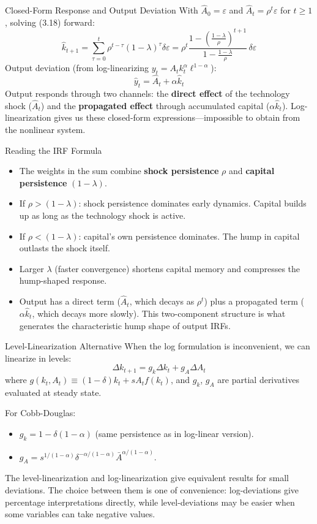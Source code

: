 \documentclass[aspectratio=169,10pt]{beamer}
\newcommand{\apxbutton}[1]{\hfill\hyperlink{#1}{\beamerbutton{Appendix}}}
\begin{document}
\begin{frame}{Closed-Form Response and Output Deviation}
\hypertarget{m-a16}{}
With $\hat{A}_0=\varepsilon$ and $\hat{A}_t=\rho^t\varepsilon$ for $t\geq 1$, solving (3.18) forward:
\[
\hat{k}_{t+1}=\sum_{\tau=0}^{t}\rho^{t-\tau}(1-\lambda)^{\tau}\delta\varepsilon
= \rho^t \frac{1-\left(\frac{1-\lambda}{\rho}\right)^{t+1}}{1-\frac{1-\lambda}{\rho}}\,\delta\varepsilon
\]
Output deviation (from log-linearizing $y_t = A_t k_t^{\alpha}\ell^{1-\alpha}$):
\[
\hat{y}_t=\hat{A}_t+\alpha\hat{k}_t
\]
Output responds through two channels: the \textbf{direct effect} of the technology shock ($\hat{A}_t$) and the \textbf{propagated effect} through accumulated capital ($\alpha\hat{k}_t$). Log-linearization gives us these closed-form expressions---impossible to obtain from the nonlinear system.
\apxbutton{a16}
\end{frame}

\begin{frame}{Reading the IRF Formula}
\begin{itemize}
  \item The weights in the sum combine \textbf{shock persistence} $\rho$ and \textbf{capital persistence} $(1-\lambda)$.
  \item If $\rho>(1-\lambda)$: shock persistence dominates early dynamics. Capital builds up as long as the technology shock is active.
  \item If $\rho<(1-\lambda)$: capital's own persistence dominates. The hump in capital outlasts the shock itself.
  \item Larger $\lambda$ (faster convergence) shortens capital memory and compresses the hump-shaped response.
  \item Output has a direct term ($\hat{A}_t$, which decays as $\rho^t$) plus a propagated term ($\alpha\hat{k}_t$, which decays more slowly). This two-component structure is what generates the characteristic hump shape of output IRFs.
\end{itemize}
\end{frame}

\begin{frame}{Level-Linearization Alternative}
When the log formulation is inconvenient, we can linearize in levels:
\[
\Delta k_{t+1}=g_k\Delta k_t + g_A\Delta A_t
\]
where $g(k_t,A_t)\equiv(1-\delta)k_t+sA_tf(k_t)$, and $g_k$, $g_A$ are partial derivatives evaluated at steady state.

\medskip
For Cobb-Douglas:
\begin{itemize}
  \item $g_k = 1-\delta(1-\alpha)$ (same persistence as in log-linear version).
  \item $g_A = s^{1/(1-\alpha)}\delta^{-\alpha/(1-\alpha)}\bar{A}^{\alpha/(1-\alpha)}$.
\end{itemize}

The level-linearization and log-linearization give equivalent results for small deviations. The choice between them is one of convenience: log-deviations give percentage interpretations directly, while level-deviations may be easier when some variables can take negative values.
\end{frame}
\end{document}
